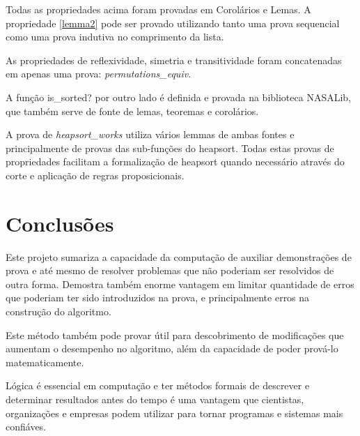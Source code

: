 Todas as propriedades acima foram provadas em Corolários e Lemas. A propriedade \ref{lemma2} pode ser provado utilizando tanto uma prova sequencial como uma prova indutiva no comprimento da lista. 

As propriedades de reflexividade, simetria e transitividade foram concatenadas em apenas uma prova: \textit{permutations\_equiv}.

A função is\_sorted? por outro lado é definida e provada na biblioteca NASALib, que também serve de fonte de lemas, teoremas e corolários.

A prova de \textit{heapsort\_works} utiliza vários lemmas de ambas fontes e principalmente de provas das sub-funções do heapsort. Todas estas provas de propriedades facilitam a formalização de heapsort quando necessário através do corte e aplicação de regras proposicionais.

\chapter{Conclusões}

Este projeto sumariza a capacidade da computação de auxiliar demonstrações de prova e até mesmo de resolver problemas que não poderiam ser resolvidos de outra forma. Demostra também enorme vantagem em limitar quantidade de erros que poderiam ter sido introduzidos na prova, e principalmente erros na construção do algoritmo.

Este método também pode provar útil para descobrimento de modificações que aumentam o desempenho no algoritmo, além da capacidade de poder prová-lo matematicamente.

Lógica é essencial em computação e ter métodos formais de descrever e determinar resultados antes do tempo é uma vantagem que cientistas, organizações e empresas podem utilizar para tornar programas e sistemas mais confiáves.
